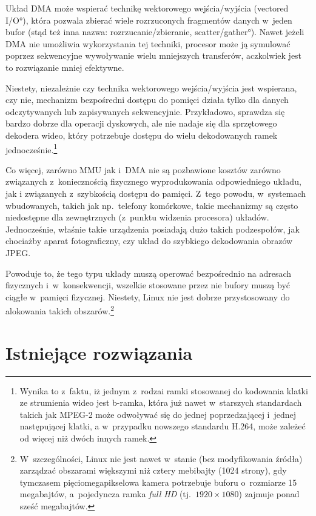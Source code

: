 Układ DMA może wspierać technikę wektorowego wejścia/wyjścia
(\ang{vectored I/O}), która pozwala zbierać wiele rozrzuconych
fragmentów danych w~jeden bufor (stąd też inna nazwa:
rozrzucanie/zbieranie, \ang{scatter/gather}).  Nawet jeżeli DMA nie
umożliwia wykorzystania tej techniki, procesor może ją symulować
poprzez sekwencyjne wywoływanie wielu mniejszych transferów,
aczkolwiek jest to rozwiązanie mniej efektywne.

Niestety, niezależnie czy technika wektorowego wejścia/wyjścia jest
wspierana, czy nie, mechanizm bezpośredni dostępu do pomięci działa
tylko dla danych odczytywanych lub zapisywanych sekwencyjnie.
Przykładowo, sprawdza się bardzo dobrze dla operacji dyskowych, ale
nie nadaje się dla sprzętowego dekodera wideo, który potrzebuje
dostępu do wielu dekodowanych ramek jednocześnie.\footnote{Wynika to
  z~faktu, iż jednym z~rodzai ramki stosowanej do kodowania klatki ze
  strumienia wideo jest b-ramka, która już nawet w~starszych
  standardach takich jak MPEG-2 może odwoływać się do jednej
  poprzedzającej i~jednej następującej klatki, a w~przypadku nowszego
  standardu H.264, może zależeć od więcej niż dwóch innych ramek.}

Co więcej, zarówno MMU jak i~DMA nie są pozbawione kosztów zarówno
związanych z~koniecznością fizycznego wyprodukowania odpowiedniego
układu, jak i związanych z~szybkością dostępu do pamięci.  Z~tego
powodu, w~systemach wbudowanych, takich jak np.\ telefony komórkowe,
takie mechanizmy są często niedostępne dla zewnętrznych (z~punktu
widzenia procesora) układów.  Jednocześnie, właśnie takie urządzenia
posiadają dużo takich podzespołów, jak chociażby aparat fotograficzny,
czy układ do szybkiego dekodowania obrazów JPEG.

Powoduje to, że tego typu układy muszą operować bezpośrednio na
adresach fizycznych i~w~konsekwencji, wszelkie stosowane przez nie
bufory muszą być ciągłe w~pamięci fizycznej.  Niestety, Linux nie jest
dobrze przystosowany do alokowania takich
obszarów.\footnote{W~szczególności, Linux nie jest nawet w~stanie (bez
  modyfikowania źródła) zarządzać obszarami większymi niż cztery
  mebibajty (1024 strony), gdy tymczasem pięciomegapikselowa kamera
  potrzebuje buforu o~rozmiarze 15 megabajtów, a~pojedyncza ramka {\it
    full HD} (tj.\ $1920 \times 1080$) zajmuje ponad sześć megabajtów.}


\section{Istniejące rozwiązania}

